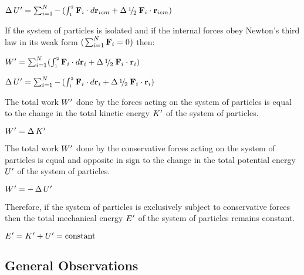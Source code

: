 \documentclass[10pt]{article}
\newcommand{\mW}{W}
\newcommand{\mK}{K}
\newcommand{\mU}{U}
\newcommand{\mE}{E}
\newcommand{\ri}{_i}
\newcommand{\ricm}{_{icm}}
\newcommand{\vR}{\mathbf{r}}
\newcommand{\vF}{\mathbf{F}}
\newcommand{\rt}{\hspace{+0.03em}'}
\newcommand{\med}{\raise.5ex\hbox{$\scriptstyle 1$}\kern-.15em/\kern-.12em\lower.45ex\hbox{$\scriptstyle 2$}\;}
\begin{document}
\bigskip
\par \hspace{+1.20em} $\Delta \, \mU\rt = \sum_{i=1}^N - \, (\int_{\scriptscriptstyle 1}^{\scriptscriptstyle 2} \hspace{+0.045em} \vF\ri \cdot d\vR\ricm + \Delta \, \med \vF\ri \cdot \vR\ricm)$
\bigskip
\par If the system of particles is isolated and if the internal forces obey Newton's third law in its weak form $( \hspace{+0.09em} \sum_{i=1}^N \vF\ri = 0 \hspace{+0.03em} )$ then:
\bigskip
\par \hspace{+1.20em} $\mW\rt = \sum_{i=1}^N \hspace{+0.036em} (\int_{\scriptscriptstyle 1}^{\scriptscriptstyle 2} \hspace{+0.045em} \vF\ri \cdot d\vR\ri + \Delta \, \med \vF\ri \cdot \vR\ri)$
\bigskip
\par \hspace{+1.20em} $\Delta \, \mU\rt = \sum_{i=1}^N - \, (\int_{\scriptscriptstyle 1}^{\scriptscriptstyle 2} \hspace{+0.045em} \vF\ri \cdot d\vR\ri + \Delta \, \med \vF\ri \cdot \vR\ri)$
\bigskip
\par The total work $\mW\rt$ done by the forces acting on the system of particles is equal to the change in the total kinetic energy $\mK\rt$ of the system of particles.
\bigskip
\par \hspace{+1.20em} $\mW\rt = \Delta \, \mK\rt$
\bigskip
\par The total work $\mW\rt$ done by the conservative forces acting on the system of particles is equal and opposite in sign to the change in the total potential energy $\mU\rt$ of the system of particles.
\bigskip
\par \hspace{+1.20em} $\mW\rt = - \, \Delta \, \mU\rt$
\bigskip
\par Therefore, if the system of particles is exclusively subject to conservative forces then the total mechanical energy $\mE\rt$ of the system of particles remains constant.
\bigskip
\par \hspace{+1.20em} $\mE\rt = \mK\rt + \mU\rt = \mathrm{constant}$

\newpage

{\centering\subsection*{General Observations}}
\end{document}

